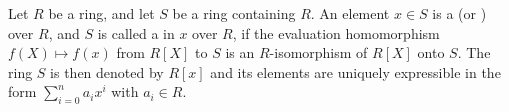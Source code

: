Let $R$ be a ring, and let $S$ be a ring containing $R$. An element $x \in S$ is a  (or ) over $R$, and $S$ is called a  in $x$ over $R$, if the evaluation homomorphism $f(X) \mapsto f(x)$ from $R[X]$ to $S$ is an $R$-isomorphism of $R[X]$ onto $S$. The ring $S$ is then denoted by $R[x]$ and its elements are uniquely expressible in the form $\sum_{i=0}^n a_i x^i$ with $a_i \in R$.
